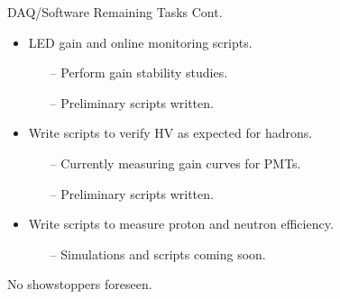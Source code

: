 \documentclass[10pt]{beamer}
\begin{document}
\begin{frame}{DAQ/Software Remaining Tasks Cont.}
   
   \begin{itemize}
   		\item LED gain and online monitoring scripts.
   			\begin{itemize}
   				\item[--] \alert{Perform gain stability studies.}
   				\item[--] \alert{Preliminary scripts written.}
   			\end{itemize}
   		\item Write scripts to verify HV as expected for hadrons.
   			\begin{itemize}
   				\item[--] \alert{Currently measuring gain curves for PMTs.}
   				\item[--] \alert{Preliminary scripts written.}
   			\end{itemize}
   		\item Write scripts to measure proton and neutron efficiency.
    			\begin{itemize}
    				\item[--] \alert{Simulations and scripts coming soon.}
    			\end{itemize}
   \end{itemize}
   
   \LARGE{\alert{No showstoppers foreseen.}}
   
\end{frame}  
\end{document}
